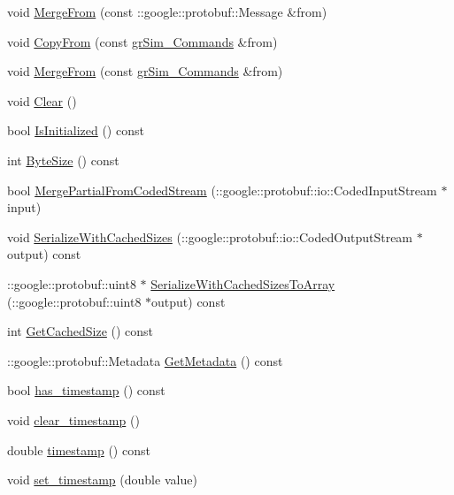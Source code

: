 \begin{DoxyCompactItemize}
\item 
void \hyperlink{classgr_sim___commands_ab63a02a86ec9defc5477450bdaacc595}{Merge\-From} (const \-::google\-::protobuf\-::\-Message \&from)
\item 
void \hyperlink{classgr_sim___commands_ab5937ed91df9ced0d540e21e8aabe310}{Copy\-From} (const \hyperlink{classgr_sim___commands}{gr\-Sim\-\_\-\-Commands} \&from)
\item 
void \hyperlink{classgr_sim___commands_a85611d7fce300833b88bcb08a7dd7574}{Merge\-From} (const \hyperlink{classgr_sim___commands}{gr\-Sim\-\_\-\-Commands} \&from)
\item 
void \hyperlink{classgr_sim___commands_abfa39850146ef66856745004ff593778}{Clear} ()
\item 
bool \hyperlink{classgr_sim___commands_a81725db2e1a58f9f28ba7b8052f06176}{Is\-Initialized} () const 
\item 
int \hyperlink{classgr_sim___commands_a187dab932379e74943e4853a1c34f86c}{Byte\-Size} () const 
\item 
bool \hyperlink{classgr_sim___commands_ac7c6ec1b3595fb6acc0e14b1b9b49734}{Merge\-Partial\-From\-Coded\-Stream} (\-::google\-::protobuf\-::io\-::\-Coded\-Input\-Stream $\ast$input)
\item 
void \hyperlink{classgr_sim___commands_a111d79157ac47a8cd1e472b1b6d09ba4}{Serialize\-With\-Cached\-Sizes} (\-::google\-::protobuf\-::io\-::\-Coded\-Output\-Stream $\ast$output) const 
\item 
\-::google\-::protobuf\-::uint8 $\ast$ \hyperlink{classgr_sim___commands_a6f67e1c43464cd4a6552a04e1e207a63}{Serialize\-With\-Cached\-Sizes\-To\-Array} (\-::google\-::protobuf\-::uint8 $\ast$output) const 
\item 
int \hyperlink{classgr_sim___commands_a4a636fdd9f56e15ab155503723d92aba}{Get\-Cached\-Size} () const 
\item 
\-::google\-::protobuf\-::\-Metadata \hyperlink{classgr_sim___commands_a0daec5fd2120415c1a3ba8cb0622963b}{Get\-Metadata} () const 
\item 
bool \hyperlink{classgr_sim___commands_adbf9e39ef110cab516868130f79ce562}{has\-\_\-timestamp} () const 
\item 
void \hyperlink{classgr_sim___commands_a1f078e2b330320ac35acab4165819426}{clear\-\_\-timestamp} ()
\item 
double \hyperlink{classgr_sim___commands_a79a0cc7e342b514c9d2ab72258c19433}{timestamp} () const 
\item 
void \hyperlink{classgr_sim___commands_a2fb5c6b1296bb12b341dcae9dfc7798d}{set\-\_\-timestamp} (double value)

\end{DoxyCompactItemize}
